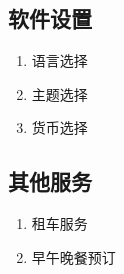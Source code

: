 \documentclass[18pt]{article}
\begin{document}
	\subsection{软件设置}
	\begin{enumerate}
		\item 语言选择
		\item 主题选择
		\item 货币选择
	\end{enumerate}
	
	\subsection{其他服务}
	\begin{enumerate}
		\item 租车服务
		\item 早午晚餐预订
	\end{enumerate}

	
\end{document}
